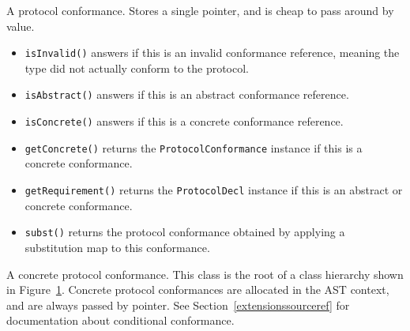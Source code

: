 \documentclass[../generics]{subfiles}
\begin{document}
A protocol conformance. Stores a single pointer, and is cheap to pass around by value.
\begin{itemize}
\item \texttt{isInvalid()} answers if this is an invalid conformance reference, meaning the type did not actually conform to the protocol.
\item \texttt{isAbstract()} answers if this is an abstract conformance reference.
\item \texttt{isConcrete()} answers if this is a concrete conformance reference.
\item \texttt{getConcrete()} returns the \texttt{ProtocolConformance} instance if this is a concrete conformance.
\item \texttt{getRequirement()} returns the \texttt{ProtocolDecl} instance if this is an abstract or concrete conformance.
\item \texttt{subst()} returns the protocol conformance obtained by applying a substitution map to this conformance.
\end{itemize}

A concrete protocol conformance. This class is the root of a class hierarchy shown in Figure~\ref{conformancehierarchy}. Concrete protocol conformances are allocated in the AST context, and are always passed by pointer. See Section~\ref{extensionssourceref} for documentation about conditional conformance.

\begin{figure}\label{conformancehierarchy}
\begin{center}
\end{center}
\end{figure}
\end{document}
